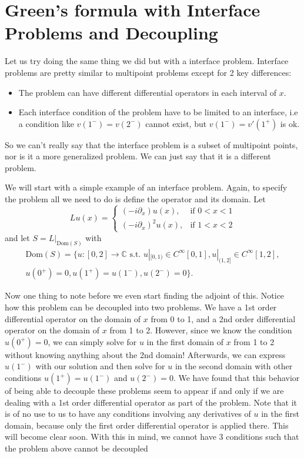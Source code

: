 \documentclass[11pt,reqno,oneside,a4paper]{article}
\begin{document}
\section*{Green's formula with Interface Problems and Decoupling}
Let us try doing the same thing we did but with a interface problem. Interface problems are pretty similar to multipoint problems except for 2 key differences:
\begin{itemize}
	\item The problem can have different differential operators in each interval of $x$.
	\item Each interface condition of the problem have to be limited to an interface, i.e a condition like $v(1^-)=v(2^-)$ cannot exist, but $v(1^-)=v'(1^+)$ is ok.
\end{itemize}
So we can't really say that the interface problem is a subset of multipoint points, nor is it a more generalized problem. We can just say that it is a different problem.

We will start with a simple example of an interface problem. Again, to specify the problem all we need to do is define the operator and its domain. Let 
\[
Lu(x)= 
\begin{cases}
(-i\partial_x)u(x),& \text{if } 0 < x < 1\\
(-i\partial_x)^2u(x), & \text{if } 1 < x <2
\end{cases}
\]
and let $S = L|_{\text{Dom}(S)}$ with
\begin{multline*}
\text{Dom}(S) = \{u:[0,2] \to \mathbb{C} \text{ s.t. } u|_{[0,1)} \in C^\infty[0,1], u|_{(1,2]} \in C^\infty[1,2],\\ u(0^+) = 0, u(1^+)=u(1^-), u(2^-)=0\}.
\end{multline*} 

Now one thing to note before we even start finding the adjoint of this. Notice how this problem can be decoupled into two problems. We have a 1st order differential operator on the domain of $x$ from 0 to 1, and a 2nd order differential operator on the domain of $x$ from 1 to 2. 
However, since we know the condition $u(0^+) = 0$, we can simply solve for $u$ in the first domain of $x$ from 1 to 2 without knowing anything about the 2nd domain! Afterwards, we can express $u(1^-)$ with our solution and then solve for $u$ in the second domain with other conditions $u(1^+)=u(1^-)$ and $u(2^-)=0$. 
We have found that this behavior of being able to decouple these problems seem to appear if and only if we are dealing with a 1st order differential operator as part of the problem.
Note that it is of no use to us to have any conditions involving any derivatives of $u$ in the first domain, because only the first order differential operator is applied there. This will become clear soon. With this in mind, we cannot have 3 conditions such that the problem above cannot be decoupled
\end{document}
